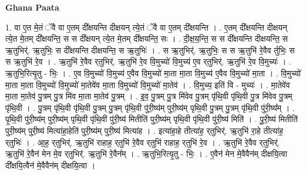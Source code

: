 \documentclass[17pt]{extarticle}
\begin{document}
\textbf{Ghana Paata } \newline

1. वा ए॒त मे॒तं ॅवै वा ए॒तम् दी᳚क्षयन्ति दीक्षयन् त्ये॒तं ॅवै वा ए॒तम् दी᳚क्षयन्ति । . ए॒तम् दी᳚क्षयन्ति दीक्षयन् त्ये॒त मे॒तम् दी᳚क्षयन्ति॒ स स दी᳚क्षयन् त्ये॒त मे॒तम् दी᳚क्षयन्ति॒ सः । . दी॒क्ष॒य॒न्ति॒ स स दी᳚क्षयन्ति दीक्षयन्ति॒ स ऋ॒तुभिर्॑. ऋ॒तुभिः॒ स दी᳚क्षयन्ति दीक्षयन्ति॒ स ऋ॒तुभिः॑ । . स ऋ॒तुभिर्॑. ऋ॒तुभिः॒ स स ऋ॒तुभि॑ रे॒वैव र्तुभिः॒ स स ऋ॒तुभि॑ रे॒व । . ऋ॒तुभि॑ रे॒वैव र्‌तुभिर्॑. ऋ॒तुभि॑ रे॒व वि॒मुच्यो॑ वि॒मुच्य॑ ए॒व र्‌तुभिर्॑. ऋ॒तुभि॑ रे॒व वि॒मुच्यः॑ । . ऋ॒तुभि॒रित्यृ॒तु - भिः॒ । . ए॒व वि॒मुच्यो॑ वि॒मुच्य॑ ए॒वैव वि॒मुच्यो॑ मा॒ता मा॒ता वि॒मुच्य॑ ए॒वैव वि॒मुच्यो॑ मा॒ता । . वि॒मुच्यो॑ मा॒ता मा॒ता वि॒मुच्यो॑ वि॒मुच्यो॑ मा॒तेवे॑व मा॒ता वि॒मुच्यो॑ वि॒मुच्यो॑ मा॒तेव॑ । . वि॒मुच्य॒ इति॑ वि - मुच्यः॑ । . मा॒तेवे॑व मा॒ता मा॒तेव॑ पु॒त्रम् पु॒त्र मि॑व मा॒ता मा॒तेव॑ पु॒त्रम् । . इ॒व॒ पु॒त्रम् पु॒त्र मि॑वेव पु॒त्रम् पृ॑थि॒वी पृ॑थि॒वी पु॒त्र मि॑वेव पु॒त्रम् पृ॑थि॒वी । . पु॒त्रम् पृ॑थि॒वी पृ॑थि॒वी पु॒त्रम् पु॒त्रम् पृ॑थि॒वी पु॑री॒ष्य॑म् पुरी॒ष्य॑म् पृथि॒वी पु॒त्रम् पु॒त्रम् पृ॑थि॒वी पु॑री॒ष्य᳚म् । . पृ॒थि॒वी पु॑री॒ष्य॑म् पुरी॒ष्य॑म् पृथि॒वी पृ॑थि॒वी पु॑री॒ष्य॑ मितीति॑ पुरी॒ष्य॑म् पृथि॒वी पृ॑थि॒वी पु॑री॒ष्य॑ मिति॑ । . पु॒री॒ष्य॑ मितीति॑ पुरी॒ष्य॑म् पुरी॒ष्य॑ मित्या॑हा॒हेति॑ पुरी॒ष्य॑म् पुरी॒ष्य॑ मित्या॑ह । . इत्या॑हा॒हे तीत्या॑ह॒ र्‌तुभिर्॑. ऋ॒तुभि॑ रा॒हे तीत्या॑ह॒ र्‌तुभिः॑ । . आ॒ह॒ र्‌तुभिर्॑. ऋ॒तुभि॑ राहाह॒ र्‌तुभि॑ रे॒वैव र्‌तुभि॑ राहाह॒ र्‌तुभि॑ रे॒व । . ऋ॒तुभि॑ रे॒वैव र्‌तुभिर्॑. ऋ॒तुभि॑ रे॒वैन॑ मेन मे॒व र्‌तुभिर्॑. ऋ॒तुभि॑ रे॒वैन᳚म् । . ऋ॒तुभि॒रित्यृ॒तु - भिः॒ । . ए॒वैन॑ मेन मे॒वैवैन॑म् दीक्षयि॒त्वा दी᳚क्षयि॒त्वैन॑ मे॒वैवैन॑म् दीक्षयि॒त्वा । \newline
\end{document}
